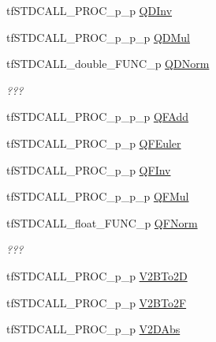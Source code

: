 \begin{DoxyCompactItemize}
\item 
tf\-S\-T\-D\-C\-A\-L\-L\-\_\-\-P\-R\-O\-C\-\_\-p\-\_\-p \hyperlink{structs_functions_vector_c_p_u_a4d965ee1f0ff415ae6818aab894cc256}{Q\-D\-Inv}
\item 
tf\-S\-T\-D\-C\-A\-L\-L\-\_\-\-P\-R\-O\-C\-\_\-p\-\_\-p\-\_\-p \hyperlink{structs_functions_vector_c_p_u_a58fe39a574e54c9437bfe76983f7a87a}{Q\-D\-Mul}
\item 
\hypertarget{structs_functions_vector_c_p_u_a71fc1539eb55fefcde69c8652e55579e}{tf\-S\-T\-D\-C\-A\-L\-L\-\_\-double\-\_\-\-F\-U\-N\-C\-\_\-p \hyperlink{structs_functions_vector_c_p_u_a71fc1539eb55fefcde69c8652e55579e}{Q\-D\-Norm}}\label{structs_functions_vector_c_p_u_a71fc1539eb55fefcde69c8652e55579e}

\begin{DoxyCompactList}\small\item\em ??? \end{DoxyCompactList}\item 
tf\-S\-T\-D\-C\-A\-L\-L\-\_\-\-P\-R\-O\-C\-\_\-p\-\_\-p\-\_\-p \hyperlink{structs_functions_vector_c_p_u_a3514689c68f2aa6fe02baa958f32f39d}{Q\-F\-Add}
\item 
tf\-S\-T\-D\-C\-A\-L\-L\-\_\-\-P\-R\-O\-C\-\_\-p\-\_\-p \hyperlink{structs_functions_vector_c_p_u_abfa126e5c45c1b495a89a64b83327904}{Q\-F\-Euler}
\item 
tf\-S\-T\-D\-C\-A\-L\-L\-\_\-\-P\-R\-O\-C\-\_\-p\-\_\-p \hyperlink{structs_functions_vector_c_p_u_a668bb1336f4fb0abcbdca20bc1928cca}{Q\-F\-Inv}
\item 
tf\-S\-T\-D\-C\-A\-L\-L\-\_\-\-P\-R\-O\-C\-\_\-p\-\_\-p\-\_\-p \hyperlink{structs_functions_vector_c_p_u_a46f586034924c39da65bd7aa4cede466}{Q\-F\-Mul}
\item 
\hypertarget{structs_functions_vector_c_p_u_ae261eb39d7e971c45994abd57d091f1b}{tf\-S\-T\-D\-C\-A\-L\-L\-\_\-float\-\_\-\-F\-U\-N\-C\-\_\-p \hyperlink{structs_functions_vector_c_p_u_ae261eb39d7e971c45994abd57d091f1b}{Q\-F\-Norm}}\label{structs_functions_vector_c_p_u_ae261eb39d7e971c45994abd57d091f1b}

\begin{DoxyCompactList}\small\item\em ??? \end{DoxyCompactList}\item 
tf\-S\-T\-D\-C\-A\-L\-L\-\_\-\-P\-R\-O\-C\-\_\-p\-\_\-p \hyperlink{structs_functions_vector_c_p_u_a108af8e60af1950c1325f9373af9198c}{V2\-B\-To2\-D}
\item 
tf\-S\-T\-D\-C\-A\-L\-L\-\_\-\-P\-R\-O\-C\-\_\-p\-\_\-p \hyperlink{structs_functions_vector_c_p_u_ac0eb94ac726eaf9d14a6d26a498b00e0}{V2\-B\-To2\-F}
\item 
\hypertarget{structs_functions_vector_c_p_u_a68b9d21014b27c6c96bd60da5efeb719}{tf\-S\-T\-D\-C\-A\-L\-L\-\_\-\-P\-R\-O\-C\-\_\-p\-\_\-p \hyperlink{structs_functions_vector_c_p_u_a68b9d21014b27c6c96bd60da5efeb719}{V2\-D\-Abs}}\label{structs_functions_vector_c_p_u_a68b9d21014b27c6c96bd60da5efeb719}


\end{DoxyCompactItemize}

